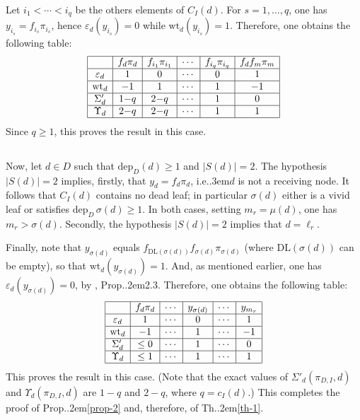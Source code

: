 \documentclass[12pt]{amsart}
\numberwithin{equation}{section}
\theoremstyle{definition}
\def\Prop{Prop.\kern.2em}
\def\Th{Th.\kern.2em}
\def\ie{{i.e.}\kern.3em}
\def\DL{\mathrm{DL}}  %
\def\dep{\mathrm{dep}} %
\def\wt{\mathrm{wt}}  %
\let\vep\varepsilon
\begin{document}
Let $i_1 < \cdots < i_q$ be the others elements of $C_I(d)$. For $s= 1,\dots, q$, 
one has $y_{i_s} = f_{i_s} \pi_{i_s}$, hence $\vep_d(y_{i_s}) = 0$ while $\wt_d(y_{i_s})=1$. 
Therefore, one obtains the following table: 
$$
\begin{array}{|c|c|c|c|c|c|c|c|c|c|}
\hline 
 & f_d \pi_d &  f_{i_1} \pi_{i_1} & \cdots & f_{i_q} \pi_{i_q} & f_{d} f_m \pi_m
\\
\hline 
\vep_d & 1 &   0 & \cdots & 0 &  1  
\\
\hline 
\wt_d & -1 & 1 & \cdots & 1 & -1 
\\
\hline 
\Sigma'_d & 1{-}q & 2{-}q & \cdots  & 1 & 0
\\
\hline 
\Upsilon_d &  2{-}q & 2{-}q & \cdots  & 1 & 1 
\\
\hline
\end{array}
$$
Since $q\geq 1$, this proves the result in this case. 

\subsection{} Now, let $d\in D$ such that $\dep_D(d) \geq 1$ and $\vert S(d) \vert =2$. 
The hypothesis $\vert S(d) \vert = 2$ implies, firstly, that $y_d = f_d \pi_d$, \ie $d$ is not a receiving node.  
It follows that $C_I(d)$ contains no dead leaf; in particular $\sigma(d)$ either is a vivid leaf or satisfies 
$\dep_D \, \sigma(d) \geq 1$. In both cases, setting $m_r = \mu(d)$, one has $m_r > \sigma(d)$. 
Secondly, the hypothesis  $\vert S(d) \vert = 2$ implies that $d = \ell_r$. 

Finally, note that $y_{\sigma(d)}$ equals $f_{\DL(\sigma(d))} f_{\sigma(d)} \pi_{\sigma(d)}$ (where 
$\DL(\sigma(d))$ can be empty), so that $\wt_d(y_{\sigma(d)} ) = 1$. And, as mentioned earlier, 
 one has $\vep_d(y_{\sigma(d)}) = 0$, by \cite{BG25}, \Prop 2.3. Therefore, one obtains the following table: 
$$
\begin{array}{|c|c|c|c|c|c|c|c|c|c|}
\hline 
 & f_d \pi_d & \cdots & y_{\sigma(d)} &   \cdots & y_{m_r} 
\\
\hline 
\vep_d & 1 &  \cdots & 0 & \cdots & 1  
\\
\hline 
\wt_d & -1 & \cdots & 1 & \cdots & -1 
\\
\hline 
\Sigma'_d & \leq 0 & \cdots & 1 & \cdots & 0
\\
\hline 
\Upsilon_d &  \leq 1 & \cdots & 1 & \cdots & 1 
\\
\hline
\end{array}
$$
This proves the result in this case. (Note that the exact values of $\Sigma'_d(\pi_{D,I}, d)$ and 
$\Upsilon_d(\pi_{D,I}, d)$ are $1{-}q$ and $2{-}q$, where $q = c_I(d)$.) 
This completes the proof of \Prop \ref{prop-2} and, therefore, of \Th \ref{th-1}. 
\end{document}
